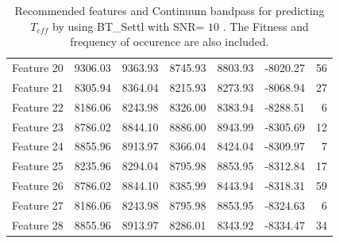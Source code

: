 {{\begin{table}
\begin{center}
\begin{tabular}{rrrrrrr}
  Feature 20 & 9306.03 & 9363.93 & 8745.93 & 8803.93 & -8020.27 &  56 \\ 
  Feature 21 & 8305.94 & 8364.04 & 8215.93 & 8273.93 & -8068.94 &  27 \\ 
  Feature 22 & 8186.06 & 8243.98 & 8326.00 & 8383.94 & -8288.51 &   6 \\ 
  Feature 23 & 8786.02 & 8844.10 & 8886.00 & 8943.99 & -8305.69 &  12 \\ 
  Feature 24 & 8855.96 & 8913.97 & 8366.04 & 8424.04 & -8309.97 &   7 \\ 
  Feature 25 & 8235.96 & 8294.04 & 8795.98 & 8853.95 & -8312.84 &  17 \\ 
  Feature 26 & 8786.02 & 8844.10 & 8385.99 & 8443.94 & -8318.31 &  59 \\ 
  Feature 27 & 8186.06 & 8243.98 & 8795.98 & 8853.95 & -8324.63 &   6 \\ 
  Feature 28 & 8855.96 & 8913.97 & 8286.01 & 8343.92 & -8334.47 &  34 \\ 
   \hline
\end{tabular}
\caption {Recommended features and Continuum bandpass for predicting $ T_{eff} $ 
      by using BT\_Settl with SNR= $ 10 $ . 
      The Fitness and frequency of occurence are also included.} \label{tab:tab_SNR10_T} 
\end{center}
\end{table}


}}
